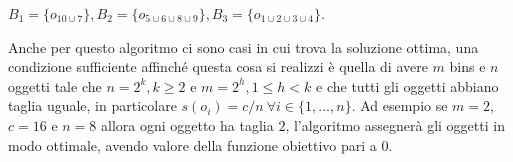 \begin{center}
	$ B_1 = \{o_{10 \cup 7}\}, B_2 = \{o_{5 \cup 6 \cup 8 \cup 9}\}, B_3 = \{o_{1 \cup 2 \cup 3 \cup 4}\} $.
\end{center}

\noindent
Anche per questo algoritmo ci sono casi in cui trova la soluzione ottima, una condizione sufficiente affinché questa cosa si realizzi
è quella di avere $ m $ bins e $ n $ oggetti tale che $ n = 2^k, k \geq 2 $ e $ m = 2^h, 1 \leq h < k $ e che tutti gli oggetti abbiano taglia uguale,
in particolare $ s(o_i) = c/n \: \forall i \in \{1, ..., n\} $.
Ad esempio se $ m = 2 $, $ c = 16 $ e $ n = 8 $ allora ogni oggetto ha taglia $ 2 $, l'algoritmo assegnerà gli oggetti in modo
ottimale, avendo valore della funzione obiettivo pari a $ 0 $.
